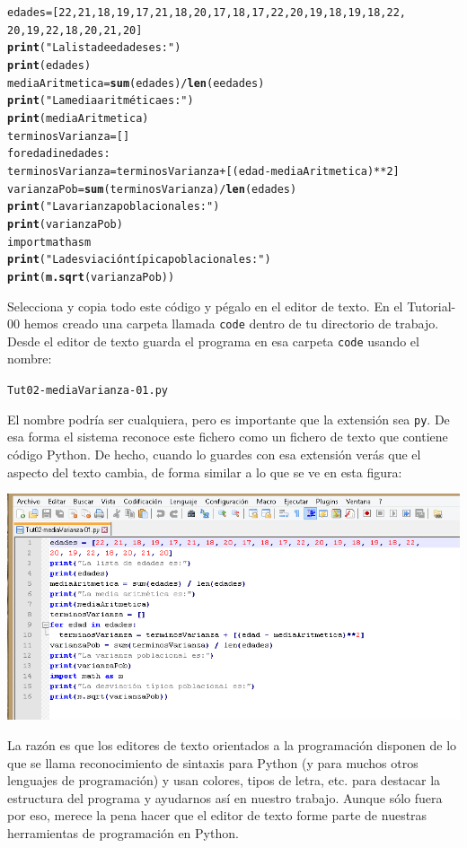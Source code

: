 \documentclass[10pt,a4paper]{article}\usepackage[]{graphicx}\usepackage[]{color}
\makeatletter
\newcommand{\hlstr}[1]{\textcolor[rgb]{0.192,0.494,0.8}{#1}}%
\newcommand{\hlkwd}[1]{\textcolor[rgb]{0.737,0.353,0.396}{\textbf{#1}}}%
\newenvironment{kframe}{%
 \def\at@end@of@kframe{}%
 \ifinner\ifhmode%
  \def\at@end@of@kframe{\end{minipage}}%
  \begin{minipage}{\columnwidth}%
 \fi\fi%
 \def\FrameCommand##1{\hskip\@totalleftmargin \hskip-\fboxsep
 \colorbox{shadecolor}{##1}\hskip-\fboxsep
     \hskip-\linewidth \hskip-\@totalleftmargin \hskip\columnwidth}%
 \MakeFramed {\advance\hsize-\width
   \@totalleftmargin\z@ \linewidth\hsize
   \@setminipage}}%
 {\par\unskip\endMakeFramed%
 \at@end@of@kframe}
\newenvironment{knitrout}{}{} %
\newcounter {cont01}
\makeatother
\begin{document}
\begin{knitrout}
\color{fgcolor}\begin{kframe}
\begin{alltt}
edades = [22, 21, 18, 19, 17, 21, 18, 20, 17, 18, 17, 22, 20, 19, 18, 19, 18, 22,
20, 19, 22, 18, 20, 21, 20]
\hlkwd{print}(\hlstr{"La lista de edades es:"})
\hlkwd{print}(edades)
mediaAritmetica = \hlkwd{sum}(edades) / \hlkwd{len}(eedades)
\hlkwd{print}(\hlstr{"La media aritmética es:"})
\hlkwd{print}(mediaAritmetica)
terminosVarianza = []
for edad in edades:
  terminosVarianza = terminosVarianza + [(edad - mediaAritmetica)**2]
varianzaPob = \hlkwd{sum}(terminosVarianza) / \hlkwd{len}(edades)
\hlkwd{print}(\hlstr{"La varianza poblacional es:"})
\hlkwd{print}(varianzaPob)
import math as m
\hlkwd{print}(\hlstr{"La desviación típica poblacional es:"})
\hlkwd{print}(\hlkwd{m.sqrt}(varianzaPob))
\end{alltt}
\end{kframe}
\end{knitrout}
Selecciona y copia todo este código y pégalo en el editor de texto. En el Tutorial-00 hemos creado una carpeta llamada {\tt code} dentro de tu directorio de trabajo. Desde el editor de texto guarda el programa en esa carpeta {\tt code} usando el nombre:
\begin{knitrout}
\color{fgcolor}\begin{kframe}
\begin{alltt}
Tut02-mediaVarianza-01.py
\end{alltt}
\end{kframe}
\end{knitrout}
El nombre podría ser cualquiera, pero es importante que la extensión sea {\tt py}. De esa forma el sistema reconoce este fichero como un fichero de texto que contiene código Python. De hecho, cuando lo guardes con esa extensión verás que el aspecto del texto cambia, de forma similar a lo que se ve en esta figura:
\begin{center}
\includegraphics[width=15cm]{../fig/Tut02-py-07-EditorTextoSintaxis.png}
\end{center}
La razón es que los editores de texto orientados a la programación disponen de lo que se llama {\sf reconocimiento de sintaxis} para Python (y para muchos otros lenguajes de programación) y usan colores, tipos de letra, etc. para destacar la estructura del programa y ayudarnos así en nuestro trabajo. Aunque sólo fuera por eso, merece la pena hacer que el editor de texto forme parte de nuestras herramientas de programación en Python.
\end{document}
